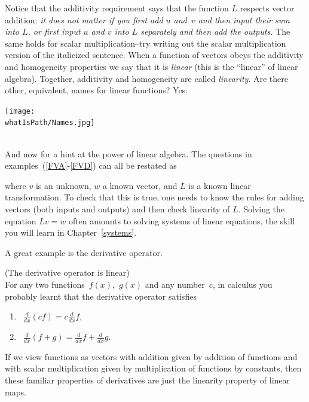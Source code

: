 Notice that the additivity 
requirement says that the function $L$ respects vector addition: {\it it does not matter if you first add $u$ and~$v$ and then input their sum into
$L$, or first input $u$ and $v$ into $L$ separately and then add the outputs.} The same holds for scalar multiplication--try writing out the scalar multiplication version of the italicized sentence. When a function of vectors obeys the additivity and homogeneity properties we say that it is {\it linear} (this is the ``linear'' of linear algebra). Together, additivity and homogeneity are called {\it linearity}. 
Are there other, equivalent, names for linear functions? Yes:
\begin{center}
\texttt{[image: \\whatIsPath/Names.jpg]}
\\
\\
\end{center}

And now for a hint at the power of linear algebra. 
The questions in examples~(\ref{FVA}-\ref{FVD}) can all be restated as %
\begin{center}
\end{center}
where $v$ is an unknown, $w$ a known vector, and $L$ is  a known linear transformation.
To check that this is true, one needs to know the rules for adding vectors (both inputs and outputs)
and then check linearity of $L$. Solving the equation $Lv=w$ often amounts  to solving systems of linear equations,
the skill you will learn in  Chapter~\ref{systems}.



A great example is the derivative operator.
\begin{example} (The derivative operator is linear)\\
For any two functions~$f(x)$,~$g(x)$ and any number~$c$, in calculus you probably learnt that the derivative operator satisfies
\begin{enumerate}
\item ~$\frac{d}{dx} (cf)=c\frac{d}{dx} f$, \\[-.5cm]
\item~$\frac{d}{dx}(f+g)=\frac{d}{dx}f+\frac{d}{dx}g$.\\[-.5cm]
\end{enumerate}
If we view functions  as vectors with addition given by addition of functions and with scalar multiplication given by multiplication of functions by constants, then these familiar properties of derivatives are just the linearity property of linear maps.
\end{example}

